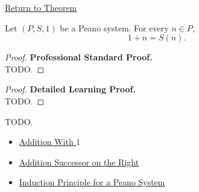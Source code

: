 \newpage
{}
\label{prf:one-plus-n}

\begin{remark*}[Return]
\hyperref[thm:one-plus-n]{Return to Theorem}
\end{remark*}

\begin{theorem*}
Let $(P,S,1)$ be a Peano system. For every $n \in P$,
\[
1+n=S(n).
\]
\end{theorem*}

\begin{proof}
\textbf{Professional Standard Proof.}~\\
TODO.
\end{proof}

\begin{proof}
\textbf{Detailed Learning Proof.}~\\
TODO.
\end{proof}

\begin{remark*}
TODO.
\end{remark*}

\begin{dependencies}
\begin{itemize}
  \item \hyperref[thm:addition-with-one]{Addition With $1$}
  \item \hyperref[thm:addition-successor-on-right]{Addition Successor on the Right}
  \item \hyperref[thm:induction-principle-for-peano-system]{Induction Principle for a Peano System}
\end{itemize}
\end{dependencies}
